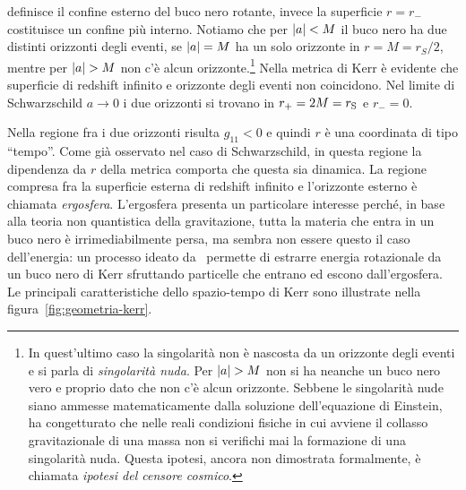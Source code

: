 definisce il confine esterno del buco nero rotante, invece la superficie \(r =
r_{-}\) costituisce un confine più interno.  Notiamo che per \(\lvert a\rvert < M\) il
buco nero ha due distinti orizzonti degli eventi, se \(\lvert a\rvert = M\) ha un solo
orizzonte in \(r = M = r_{S}/2\), mentre per \(\lvert a\rvert > M\) non c'è alcun
orizzonte.\footnote{In quest'ultimo caso la singolarità non è nascosta da un
  orizzonte degli eventi e si parla di \emph{singolarità nuda}.  Per \(\lvert a\rvert >
  M\) non si ha neanche un buco nero vero e proprio dato che non c'è alcun
  orizzonte.  Sebbene le singolarità nude siano ammesse matematicamente dalla
  soluzione dell'equazione di Einstein, \textcite{1969NCimR...1..252P} ha
  congetturato che nelle reali condizioni fisiche in cui avviene il collasso
  gravitazionale di una massa non si verifichi mai la formazione di una
  singolarità nuda.  Questa ipotesi, ancora non dimostrata formalmente, è
  chiamata \emph{ipotesi del censore cosmico}.}  Nella metrica di Kerr è
evidente che superficie di redshift infinito e orizzonte degli eventi non
coincidono.  Nel limite di Schwarzschild \(a\to 0\) i due orizzonti si trovano
in \(r_{+} = 2M = r_{\textup{S}}\) e \(r_{-} = 0\).

Nella regione fra i due orizzonti risulta \(g_{11} < 0\) e quindi \(r\) è una
coordinata di tipo ``tempo''.  Come già osservato nel caso di Schwarzschild, in
questa regione la dipendenza da \(r\) della metrica comporta che questa sia
dinamica.  La regione compresa fra la superficie esterna di redshift infinito e
l'orizzonte esterno è chiamata \emph{ergosfera}.  L'ergosfera presenta un
particolare interesse perché, in base alla teoria non quantistica della
gravitazione, tutta la materia che entra in un buco nero è irrimediabilmente
persa, ma sembra non essere questo il caso dell'energia: un processo ideato
da~\textcite{1969NCimR...1..252P} permette di estrarre energia rotazionale da un
buco nero di Kerr sfruttando particelle che entrano ed escono dall'ergosfera.
Le principali caratteristiche dello spazio-tempo di Kerr sono illustrate nella
figura~\ref{fig:geometria-kerr}.

